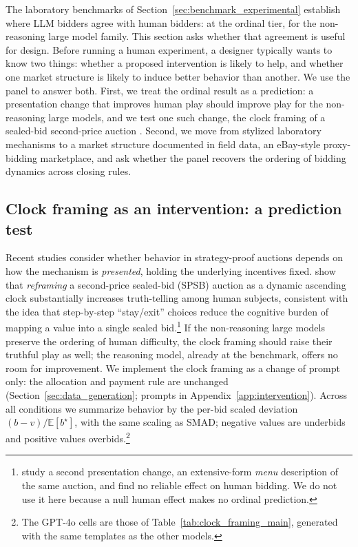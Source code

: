 \documentclass[acmsmall,screen,review]{acmart}
\begin{document}
The laboratory benchmarks of Section~\ref{sec:benchmark_experimental} establish where LLM bidders agree with human bidders: at the ordinal tier, for the non-reasoning large model family. This section asks whether that agreement is useful for design. Before running a human experiment, a designer typically wants to know two things: whether a proposed intervention is likely to help, and whether one market structure is likely to induce better behavior than another. We use the panel to answer both. First, we treat the ordinal result as a prediction: a presentation change that improves human play should improve play for the non-reasoning large models, and we test one such change, the clock framing of a sealed-bid second-price auction \citep{breitmoser2022obviousness}. Second, we move from stylized laboratory mechanisms to a market structure documented in field data, an eBay-style proxy-bidding marketplace, and ask whether the panel recovers the ordering of bidding dynamics across closing rules.

\subsection{\texorpdfstring{Clock framing as an intervention: a prediction test}{Clock framing as an intervention: a prediction test}}\label{session:Intervention}

Recent studies consider whether behavior in strategy-proof auctions depends on how the mechanism is \emph{presented}, holding the underlying incentives fixed. \citet{breitmoser2022obviousness} show that \emph{reframing} a second-price sealed-bid (SPSB) auction as a dynamic ascending clock substantially increases truth-telling among human subjects, consistent with the idea that step-by-step ``stay/exit'' choices reduce the cognitive burden of mapping a value into a single sealed bid.\footnote{\citet{gonczarowski2023strategyproofness} study a second presentation change, an extensive-form \emph{menu} description of the same auction, and find no reliable effect on human bidding. We do not use it here because a null human effect makes no ordinal prediction.} If the non-reasoning large models preserve the ordering of human difficulty, the clock framing should raise their truthful play as well; the reasoning model, already at the benchmark, offers no room for improvement. We implement the clock framing as a change of prompt only: the allocation and payment rule are unchanged (Section~\ref{sec:data_generation}; prompts in Appendix~\ref{app:intervention}). Across all conditions we summarize behavior by the per-bid scaled deviation $(b-v)/\mathbb{E}[b^\star]$, with the same scaling as SMAD; negative values are underbids and positive values overbids.\footnote{The GPT-4o cells are those of Table~\ref{tab:clock_framing_main}, generated with the same templates as the other models.}
\end{document}
